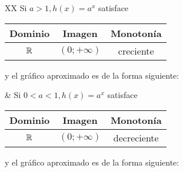 \documentclass[../Teoría.root.tex]{subfiles}
\begin{document}
        \begin{tabularx}{\textwidth}{XX}
            Si \(a>1, h(x)=a^x\) satisface
            \begin{center}
                \begin{tabular}{|c|c|c|}
                    \hline
                    Dominio & Imagen & Monotonía\\\hline
                    \(\mathbb{R}\) & \((0;+\infty)\) & creciente\\
                    \hline
                \end{tabular}
            \end{center}
            y el gráfico aproximado es de la forma siguiente:
            \begin{center}
            \end{center} 
            &
            Si \(0<a<1, h(x)=a^x\) satisface
            \begin{center}
                \begin{tabular}{|c|c|c|}
                    \hline
                    Dominio & Imagen & Monotonía\\\hline
                    \(\mathbb{R}\) & \((0;+\infty)\) & decreciente\\
                    \hline
                \end{tabular}
            \end{center}
            y el gráfico aproximado es de la forma siguiente:
            \begin{center}
            \end{center} 
        \end{tabularx}
\end{document}
